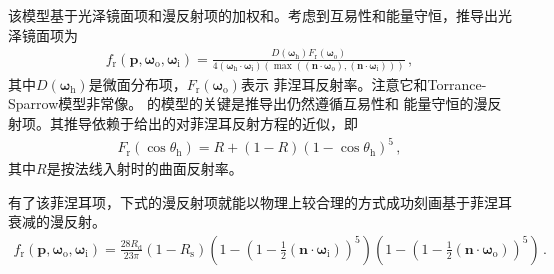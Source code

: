 该模型基于光泽镜面项和漫反射项的加权和。考虑到互易性和能量守恒，推导出光泽镜面项为
\begin{align*}
    f_{\mathrm{r}}({\bm p},{\bm\omega}_{\mathrm{o}},{\bm\omega}_{\mathrm{i}})
    =\frac{D({\bm\omega}_{\mathrm{h}})F_{\mathrm{r}}({\bm\omega}_{\mathrm{o}})}
    {4({\bm\omega}_{\mathrm{h}}\cdot{\bm\omega}_{\mathrm{i}})
    (\max(({\bm n}\cdot{\bm\omega}_{\mathrm{o}}),({\bm n}\cdot{\bm\omega}_{\mathrm{i}})))}\, ,
\end{align*}
其中$D({\bm\omega}_{\mathrm{h}})$是微面分布项，$F_{\mathrm{r}}({\bm\omega}_{\mathrm{o}})$表示
菲涅耳反射率。注意它和Torrance-Sparrow模型非常像。
\citeauthor{AshikhminPhong}的模型的关键是推导出仍然遵循互易性和
能量守恒的漫反射项。其推导依赖于\citet{Schlick1993}给出的对菲涅耳反射方程的近似，即
\begin{align*}
    F_{\mathrm{r}}(\cos\theta_{\mathrm{h}})=R+(1-R)(1-\cos\theta_{\mathrm{h}})^5\, ,
\end{align*}
其中$R$是按法线入射时的曲面反射率。

有了该菲涅耳项，下式的漫反射项就能以物理上较合理的方式成功刻画基于菲涅耳衰减的漫反射。
\begin{align*}
    f_{\mathrm{r}}({\bm p},{\bm\omega}_{\mathrm{o}},{\bm\omega}_{\mathrm{i}})
    =\frac{28R_{\mathrm{d}}}{23\pi}(1-R_{\mathrm{s}})
    \left(1-\left(1-\frac{1}{2}({\bm n}\cdot{\bm\omega}_{\mathrm{i}})\right)^5\right)
    \left(1-\left(1-\frac{1}{2}({\bm n}\cdot{\bm\omega}_{\mathrm{o}})\right)^5\right)\, .
\end{align*}

